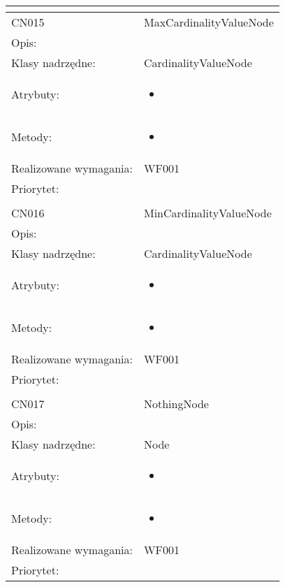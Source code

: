 \documentclass[a4paper,10pt]{article}
\begin{document}
\begin{center}
\begin{tabular}{|m{3cm}|m{9cm}|}
\multicolumn{2}{c}{} \\
 \hline

CN015 & MaxCardinalityValueNode \\ \hline
Opis: &     \\ \hline
Klasy nadrzędne: & CardinalityValueNode     \\ \hline
Atrybuty: & \begin{itemize}
 \item 
\end{itemize}
 \\ \hline
Metody: & \begin{itemize}
 \item 
\end{itemize}
  \\ \hline
Realizowane wymagania: & WF001 \\ \hline
Priorytet: &  \\ \hline

\multicolumn{2}{c}{} \\
 \hline

CN016 & MinCardinalityValueNode \\ \hline
Opis: &     \\ \hline
Klasy nadrzędne: & CardinalityValueNode     \\ \hline
Atrybuty: & \begin{itemize}
 \item 
\end{itemize}
 \\ \hline
Metody: & \begin{itemize}
 \item 
\end{itemize}
  \\ \hline
Realizowane wymagania: & WF001 \\ \hline
Priorytet: &  \\ \hline

\multicolumn{2}{c}{} \\
 \hline

CN017 & NothingNode \\ \hline
Opis: &     \\ \hline
Klasy nadrzędne: & Node     \\ \hline
Atrybuty: & \begin{itemize}
 \item 
\end{itemize}
 \\ \hline
Metody: & \begin{itemize}
 \item 
\end{itemize}
  \\ \hline
Realizowane wymagania: & WF001 \\ \hline
Priorytet: &  \\ \hline


\end{tabular}
\end{center}
\end{document}
